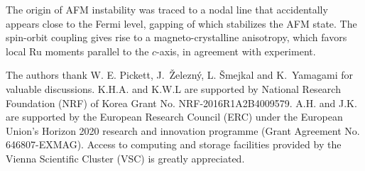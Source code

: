 \documentclass[reprint,twocolumn,superscriptaddress,secnumarabic,amssymb, nobibnotes, aps, prb]{revtex4-1}
\begin{document}
The origin of AFM instability was traced to a nodal line that accidentally appears close to the Fermi level,
gapping of which stabilizes the AFM state. The spin-orbit coupling gives rise to 
a magneto-crystalline anisotropy, which favors local Ru moments parallel to the $c$-axis, in agreement with experiment.

\begin{acknowledgements}
The authors thank W. E. Pickett,  J.~\v{Z}elezn\'y, L. \v{S}mejkal and K.~Yamagami for valuable discussions.
K.H.A. and K.W.L are supported by National Research Foundation (NRF) of Korea Grant No. NRF-2016R1A2B4009579.
A.H. and J.K. are supported by the European Research Council (ERC) under the European Union’s Horizon 2020 research and innovation programme (Grant Agreement No. 646807-EXMAG).
Access to computing and storage facilities provided by the Vienna Scientific Cluster (VSC) is greatly appreciated.
\end{acknowledgements}

%

\end{document}
